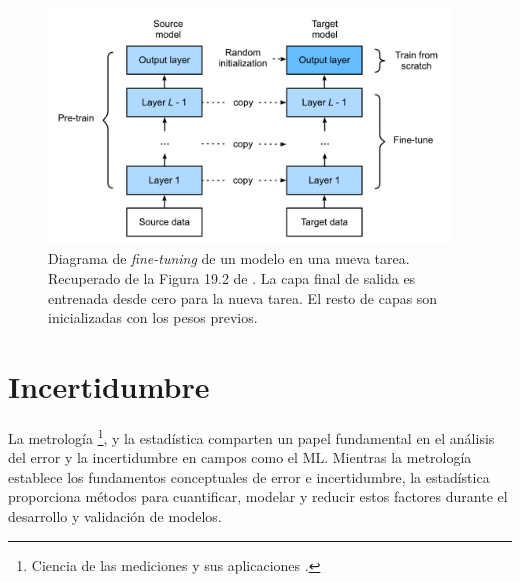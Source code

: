 \begin{figure}[h]
    \centering
    \includegraphics[width=0.95\textwidth]{capitulos/cap_02/imagenes/fine-tunning.png}
    \caption[
        Diagrama de \textit{fine-tuning} de un modelo en una nueva tarea. 
        Recuperado de la Figura 19.2 de \cite{murphy2022}.
    ]{
        Diagrama de \textit{fine-tuning} de un modelo en una nueva tarea. 
        Recuperado de la Figura 19.2 de \cite{murphy2022}.
        La capa final de salida es entrenada desde cero para la nueva tarea. El resto de capas son 
        inicializadas con los pesos previos. 
    } 
    \label{fig:fine-tuning}
\end{figure}


\section{Incertidumbre}

La metrología%
\footnote{
    Ciencia de las mediciones y sus aplicaciones \cite{jcgm200:2012}.
},
y la estadística comparten un papel fundamental en el análisis del error y la incertidumbre en campos como 
el ML. Mientras la metrología establece los fundamentos conceptuales de error e incertidumbre, la estadística 
proporciona métodos para cuantificar, modelar y reducir estos factores durante el desarrollo y validación de 
modelos.


